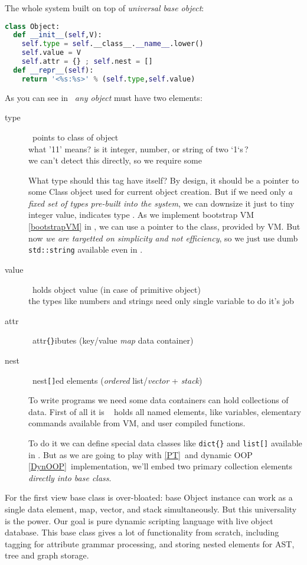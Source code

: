 \label{Object}\secdown

The whole system built on top of \emph{universal base object}: 

\begin{lstlisting}[language=Python]
class Object:
  def __init__(self,V):
    self.type = self.__class__.__name__.lower()
    self.value = V
    self.attr = {} ; self.nest = []
  def __repr__(self):
    return '<%s:%s>' % (self.type,self.value)
\end{lstlisting}

\noindent
As you can see in \cite{budd}\ \emph{any object} must have two elements:
\begin{description}%
\item[type]\ points to class of object\\
what '11' means? is it integer, number, or string of two `1`s\,?\\
we can't detect this directly, so we require some 

What type should this tag have itself? By design, it should be a pointer to some
Class object used for current object creation. But if we need only \emph{a fixed
set of types pre-built into the system}, we can downsize it just to tiny integer
value, indicates type \cite{STFPGA}. As we implement bootstrap VM
\ref{bootstrapVM} in \py, we can use a pointer to the class, provided by \py
VM. But now \emph{we are targetted on simplicity and not efficiency}, so we just
use dumb \verb|std::string| available even in \cpp.

\item[value]\ holds object value (in case of primitive object)\ \\
the  types like numbers and strings need only single variable to
do it's job

\item[attr]\ attr\verb|{}|ibutes (key/value \emph{map} data container)
\item[nest]\ nest\verb|[]|ed elements (\textit{ordered} list/\emph{vector} +
\emph{stack})

To write programs we need some  data containers can hold
collections of data. First of all it is \F\  holds all named
elements, like variables, elementary commands available from VM, and user
compiled functions.

To do it we can define special data classes like \verb|dict{}| and \verb|list[]|
available in \py. But as we are going to play with  \ref{PT}\ and dynamic OOP \ref{DynOOP}\ implementation, we'll
embed two primary collection elements \emph{directly into base class}.
 
\end{description}

\noindent
For the first view base class is over-bloated: base Object instance can work as
a single data element, map, vector, and stack simultaneously. But this
universality is the power. Our goal is pure dynamic scripting language with live
object database. This base class gives a lot of functionality from scratch,
including tagging for attribute grammar processing, and storing nested elements
for AST, tree and graph storage.

\secup